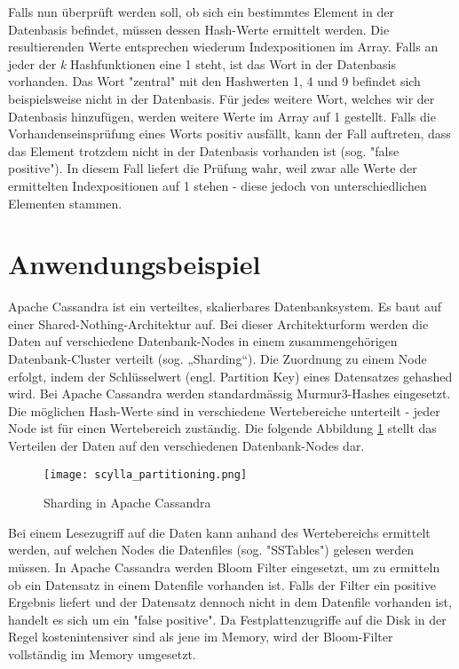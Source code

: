 \documentclass[10pt, a4paper, twocolumn]{article} %
\begin{document}
Falls nun überprüft werden soll, ob sich ein bestimmtes Element in der Datenbasis befindet, müssen dessen Hash-Werte ermittelt werden.
Die resultierenden Werte entsprechen wiederum Indexpositionen im Array. Falls an jeder der \textit{k} Hashfunktionen eine 1 steht, ist das Wort in der Datenbasis vorhanden.
Das Wort "zentral" mit den Hashwerten 1, 4 und 9 befindet sich beispielsweise nicht in der Datenbasis. Für jedes weitere Wort, welches wir der Datenbasis hinzufügen, werden weitere Werte im Array auf 1 gestellt.
Falls die Vorhandenseinsprüfung eines Worts positiv ausfällt, kann der Fall auftreten, dass das Element trotzdem nicht in der Datenbasis vorhanden ist (sog. "false positive").
In diesem Fall liefert die Prüfung wahr, weil zwar alle Werte der ermittelten Indexpositionen auf 1 stehen - diese jedoch von unterschiedlichen Elementen stammen.

\section{Anwendungsbeispiel}
\label{anwendung}
Apache  Cassandra  ist  ein  verteiltes,  skalierbares  Datenbanksystem. Es baut auf einer Shared-Nothing-Architektur auf. Bei dieser
Architekturform werden die Daten auf verschiedene Datenbank-Nodes in einem zusammengehörigen Datenbank-Cluster verteilt (sog. „Sharding“).
Die Zuordnung zu einem Node erfolgt, indem der Schlüsselwert (engl. Partition Key) eines Datensatzes gehashed wird. Bei Apache Cassandra werden standardmässig Murmur3-Hashes eingesetzt.
Die möglichen Hash-Werte sind in verschiedene Wertebereiche unterteilt - jeder Node ist für einen Wertebereich zuständig. Die folgende Abbildung \ref{scylla_ring} stellt das Verteilen der Daten auf den verschiedenen Datenbank-Nodes dar.

\begin{figure}[H]
	\texttt{[image: scylla\_partitioning.png]} %
	\caption{Sharding in Apache Cassandra} %
	\label{scylla_ring} %
\end{figure}

\newpage
Bei einem Lesezugriff auf die Daten kann anhand des Wertebereichs ermittelt werden, auf welchen Nodes die Datenfiles (sog. "SSTables") gelesen werden müssen. In Apache Cassandra werden Bloom Filter eingesetzt, um zu ermitteln ob ein Datensatz in einem Datenfile vorhanden ist. Falls der Filter ein positive Ergebnis liefert und der Datensatz dennoch nicht in dem Datenfile vorhanden ist, handelt es sich um ein "false positive". Da Festplattenzugriffe auf die Disk in der Regel kostenintensiver sind als jene im Memory, wird der Bloom-Filter vollständig im Memory umgesetzt.
\end{document}
